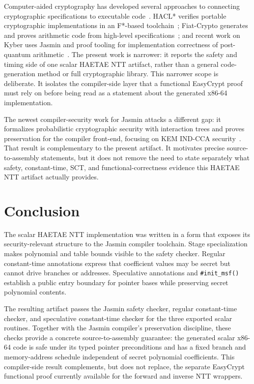 \documentclass[10pt,twocolumn]{article}
\newcommand{\haetae}{HAETAE}
\newcommand{\jasmin}{Jasmin}
\newcommand{\ct}{constant-time}
\begin{document}
Computer-aided cryptography has developed several approaches to connecting
cryptographic specifications to executable code~\cite{ComputerAidedCrypto2021}.
HACL* verifies portable cryptographic implementations in an F*-based
toolchain~\cite{HACL2017}; Fiat-Crypto generates and proves arithmetic code
from high-level specifications~\cite{FiatCrypto2019}; and recent work on Kyber
uses \jasmin{} and proof tooling for implementation correctness of
post-quantum arithmetic~\cite{KyberVerify2023}.  The present work is narrower:
it reports the safety and timing side of one scalar \haetae{} NTT artifact,
rather than a general code-generation method or full cryptographic library.
This narrower scope is deliberate.  It isolates the compiler-side layer that a
functional EasyCrypt proof must rely on before being read as a statement about
the generated x86-64 implementation.

The newest compiler-security work for \jasmin{} attacks a different gap: it
formalizes probabilistic cryptographic security with interaction trees and
proves preservation for the compiler front-end, focusing on KEM IND-CCA
security~\cite{ArranzOlmos2025JasminSecurity}.  That result is complementary to
the present artifact.  It motivates precise source-to-assembly statements, but
it does not remove the need to state separately what safety, \ct{}, SCT, and
functional-correctness evidence this HAETAE NTT artifact actually provides.

\section{Conclusion}

The scalar \haetae{} NTT implementation was written in a form that exposes its
security-relevant structure to the \jasmin{} compiler toolchain.  Stage
specialization makes polynomial and table bounds visible to the safety checker.
Regular \ct{} annotations express that coefficient values may be secret but
cannot drive branches or addresses.  Speculative annotations and
\texttt{\#init\_msf()} establish a public entry boundary for pointer bases while
preserving secret polynomial contents.

The resulting artifact passes the \jasmin{} safety checker, regular \ct{}
checker, and speculative \ct{} checker for the three exported scalar routines.
Together with the \jasmin{} compiler's preservation discipline, these checks
provide a concrete source-to-assembly guarantee: the generated scalar x86-64
code is safe under its typed pointer preconditions and has a fixed branch and
memory-address schedule independent of secret polynomial coefficients.  This
compiler-side result complements, but does not replace, the separate EasyCrypt
functional proof currently available for the forward and inverse NTT wrappers.
\end{document}
